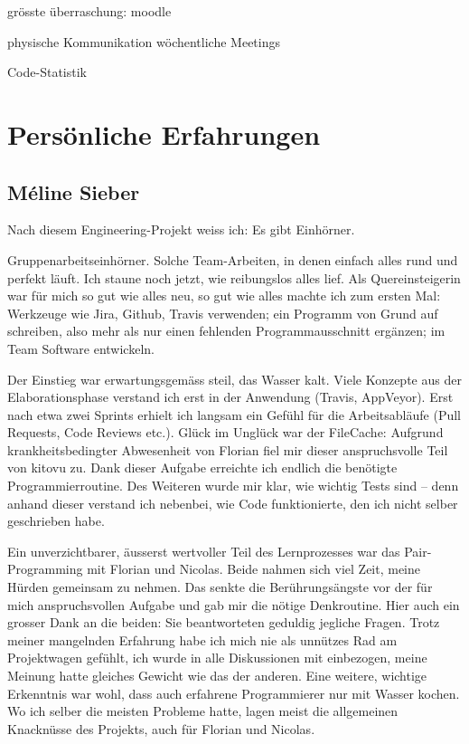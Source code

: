 \documentclass[a4paper]{article}
\let\oldsection\section
\renewcommand\section{\clearpage\oldsection}
\begin{document}
  
  grösste überraschung: moodle
  
  
  physische Kommunikation
  wöchentliche Meetings
  
  
Code-Statistik
  
  

  \section{Persönliche Erfahrungen}

  \subsection{Méline Sieber}

Nach diesem Engineering-Projekt weiss ich: Es gibt Einhörner. 

Gruppenarbeitseinhörner. Solche Team-Arbeiten, in denen einfach alles rund und perfekt läuft. Ich staune noch jetzt, wie reibungslos alles lief. Als Quereinsteigerin war für mich so gut wie alles neu, so gut wie alles machte ich zum ersten Mal: Werkzeuge wie Jira, Github, Travis verwenden; ein Programm von Grund auf schreiben, also mehr als nur einen fehlenden Programmausschnitt ergänzen; im Team Software entwickeln.

Der Einstieg war erwartungsgemäss steil, das Wasser kalt. Viele Konzepte aus der Elaborationsphase verstand ich erst in der Anwendung (Travis, AppVeyor). Erst nach etwa zwei Sprints erhielt ich langsam ein Gefühl für die Arbeitsabläufe (Pull Requests, Code Reviews etc.). Glück im Unglück war der FileCache: Aufgrund krankheitsbedingter Abwesenheit von Florian fiel mir dieser anspruchsvolle Teil von kitovu zu. Dank dieser Aufgabe erreichte ich endlich die benötigte Programmierroutine. Des Weiteren wurde mir klar, wie wichtig Tests sind -- denn anhand dieser verstand ich nebenbei, wie Code funktionierte, den ich nicht selber geschrieben habe.

Ein unverzichtbarer, äusserst wertvoller Teil des Lernprozesses war das Pair-Programming mit Florian und Nicolas. Beide nahmen sich viel Zeit, meine Hürden gemeinsam zu nehmen. Das senkte die Berührungsängste vor der für mich anspruchsvollen Aufgabe und gab mir die nötige Denkroutine. Hier auch ein grosser Dank an die beiden: Sie beantworteten geduldig jegliche Fragen. Trotz meiner mangelnden Erfahrung habe ich mich nie als unnützes Rad am Projektwagen gefühlt, ich wurde in alle Diskussionen mit einbezogen, meine Meinung hatte gleiches Gewicht wie das der anderen. Eine weitere, wichtige Erkenntnis war wohl, dass auch erfahrene Programmierer nur mit Wasser kochen. Wo ich selber die meisten Probleme hatte, lagen meist die allgemeinen Knacknüsse des Projekts, auch für Florian und Nicolas.
\end{document}
